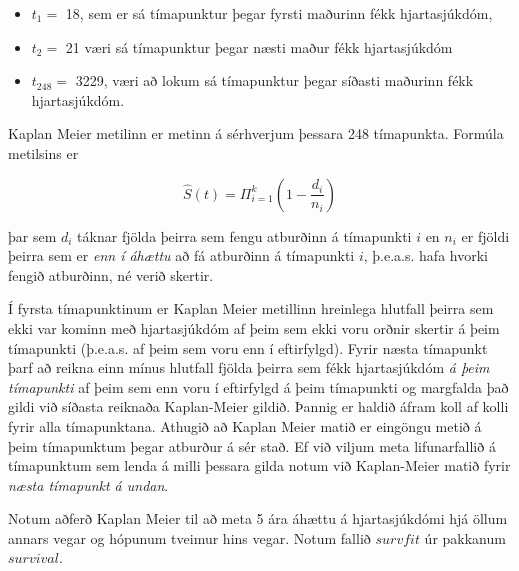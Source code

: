 \documentclass[
]{book}
\providecommand{\tightlist}{%
  \setlength{\itemsep}{0pt}\setlength{\parskip}{0pt}}
\begin{document}
\begin{itemize}
\tightlist
\item
  \(t_1 =\) 18, sem er sá tímapunktur þegar fyrsti maðurinn fékk hjartasjúkdóm,
\item
  \(t_2 =\) 21 væri sá tímapunktur þegar næsti maður fékk hjartasjúkdóm
\item
  \(t_{248} =\) 3229, væri að lokum sá tímapunktur þegar síðasti maðurinn fékk hjartasjúkdóm.
\end{itemize}

Kaplan Meier metilinn er metinn á sérhverjum þessara 248 tímapunkta. Formúla metilsins er

\[ \hat S(t) = \Pi_{i=1}^k \left( 1- \frac{d_i}{n_i} \right)\]

þar sem \(d_i\) táknar fjölda þeirra sem fengu atburðinn á tímapunkti \(i\) en \(n_i\) er fjöldi þeirra sem er \emph{enn í áhættu} að fá atburðinn á tímapunkti \(i\), þ.e.a.s. hafa hvorki fengið atburðinn, né verið skertir.

Í fyrsta tímapunktinum er Kaplan Meier metillinn hreinlega hlutfall þeirra sem ekki var kominn með hjartasjúkdóm af þeim sem ekki voru orðnir skertir á þeim tímapunkti (þ.e.a.s. af þeim sem voru enn í eftirfylgd). Fyrir næsta tímapunkt þarf að reikna einn mínus hlutfall fjölda þeirra sem fékk hjartasjúkdóm \emph{á þeim tímapunkti} af þeim sem enn voru í eftirfylgd á þeim tímapunkti og margfalda það gildi við síðasta reiknaða Kaplan-Meier gildið. Þannig er haldið áfram koll af kolli fyrir alla tímapunktana. Athugið að Kaplan Meier matið er eingöngu metið á þeim tímapunktum þegar atburður á sér stað. Ef við viljum meta lifunarfallið á tímapunktum sem lenda á milli þessara gilda notum við Kaplan-Meier matið fyrir \emph{næsta tímapunkt á undan}.

Notum aðferð Kaplan Meier til að meta 5 ára áhættu á hjartasjúkdómi hjá öllum annars vegar og hópunum tveimur hins vegar. Notum fallið \(survfit\) úr pakkanum \(survival\).
\end{document}
